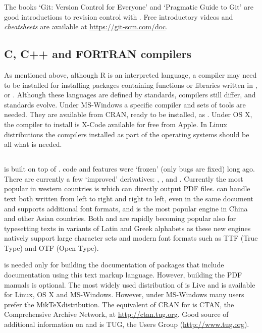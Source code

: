 \documentclass[krantz2,ChapterTOCs]{krantz}\usepackage{knitr}
\begin{document}
The books `Git: Version Control for Everyone' \autocite{Somasundaram2013} and `Pragmatic Guide to Git' \autocite{Swicegood2010} are good introductions to revision control with . Free introductory videos and \emph{cheatsheets} are available at \url{https://git-scm.com/doc}.

\subsection{C, C++ and FORTRAN compilers}

As mentioned above, although R is an interpreted language, a compiler may need to be installed for installing packages containing functions or libraries written in  ,  or  . Although these languages are defined by standards, compilers still differ, and standards evolve. Under MS-Windows a specific compiler and sets of tools are needed. They are available from CRAN, ready to be installed, as . Under OS X, the compiler to install is X-Code available for free from Apple. In Linux distributions the compilers installed as part of the operating systems should be all what is needed.

\subsection{}

 is built on top of .  code and features were `frozen' (only bugs are fixed) long ago. There are currently a few `improved' derivatives: , , and . Currently the most popular  in western countries is  which can directly output PDF files.  can handle text both written from left to right and right to left, even in the same document and supports additional font formats, and is the most popular  engine in China and other Asian countries. Both  and  are rapidly becoming popular also for typesetting texts in variants of Latin and Greek alphabets as these new  engines natively support large character sets and modern font formats such as TTF (True Type) and OTF (Open Type).

 is needed only for building the documentation of packages that include documentation using this text markup language. However, building the PDF manuals is optional. The most widely used distribution of  is Live and is available for Linux, OS X and MS-Windows. However, under MS-Windows many users prefer the Mik\TeX distribution. The equivalent of CRAN for  is CTAN, the Comprehensive  Archive Network, at \url{http://ctan.tug.org}. Good source of additional information on  and  is TUG, the  Users Group (\url{http://www.tug.org}).
\end{document}
